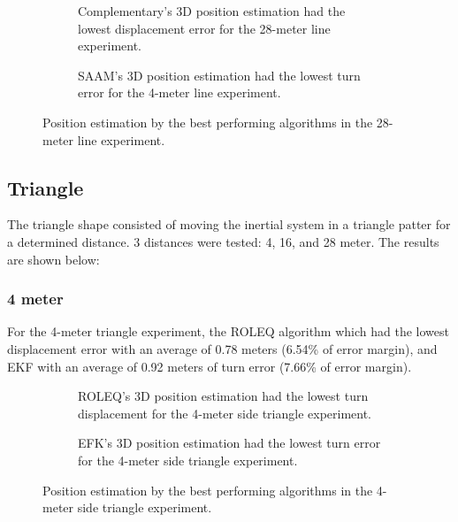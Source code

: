 \begin{figure}[!h]
    \centering
    \begin{subfigure}{0.49\textwidth}
        \centering
        \resizebox{1\linewidth}{!}{}
        \caption{Complementary's 3D position estimation had the lowest displacement error for the 28-meter line experiment.}
        \label{fig:line28_2D}
    \end{subfigure}
    \begin{subfigure}{0.49\textwidth}
        \centering
        \resizebox{1\linewidth}{!}{}
        \caption{SAAM's 3D position estimation had the lowest turn error for the 4-meter line experiment.}
        \label{fig:line28_3D}
    \end{subfigure}
    \caption{Position estimation by the best performing algorithms in the 28-meter line experiment.}
    \label{fig:line28}
\end{figure}

\subsection{Triangle}

The triangle shape consisted of moving the inertial system in a triangle patter for a determined distance. 3 distances were tested: 4, 16, and 28 meter. The results are shown below:

\subsubsection{4 meter}

For the 4-meter triangle experiment, the ROLEQ algorithm which had the lowest displacement error with an average of 0.78 meters (6.54\% of error margin), and EKF with an average of 0.92 meters of turn error (7.66\% of error margin).

\begin{figure}[!h]
    \centering
    
\end{figure}

\begin{figure}[!h]
    \centering
    \begin{subfigure}{0.49\textwidth}
        \centering
        \resizebox{1\linewidth}{!}{}
        \caption{ROLEQ's 3D position estimation had the lowest turn displacement for the 4-meter side triangle experiment.}
        \label{fig:triangle4_2D}
    \end{subfigure}
    \begin{subfigure}{0.49\textwidth}
        \centering
        \resizebox{1\linewidth}{!}{}
        \caption{EFK's 3D position estimation had the lowest turn error for the 4-meter side triangle experiment.}
        \label{fig:triangle4_3D}
    \end{subfigure}
    \caption{Position estimation by the best performing algorithms in the 4-meter side triangle experiment.}
    \label{fig:triangle4}
\end{figure}

